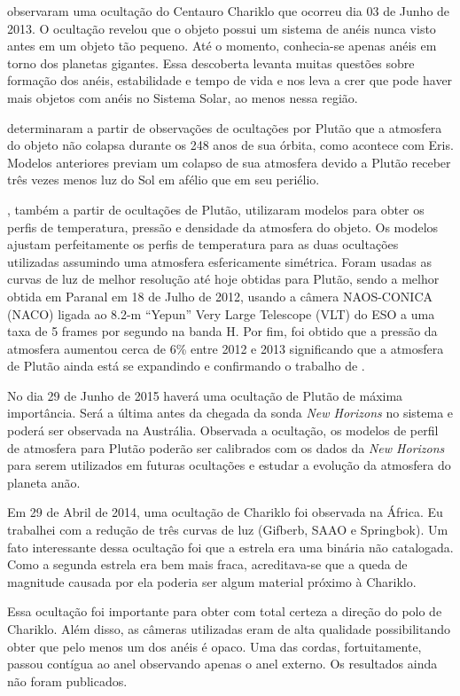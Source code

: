 \documentclass[12pt,a4paper]{monografia}
\begin{document}
\cite{BragaRibas2014} observaram uma ocultação do Centauro Chariklo que ocorreu dia 03 de Junho de 2013. O ocultação revelou que o objeto possui um sistema de anéis nunca visto antes em um objeto tão pequeno. Até o momento, conhecia-se apenas anéis em torno dos planetas gigantes. Essa descoberta levanta muitas questões sobre formação dos anéis, estabilidade e tempo de vida e nos leva a crer que pode haver mais objetos com anéis no Sistema Solar, ao menos nessa região.

\cite{Olkin2015} determinaram a partir de observações de ocultações por Plutão que a atmosfera do objeto não colapsa durante os 248 anos de sua órbita, como acontece com Eris. Modelos anteriores previam um colapso de sua atmosfera devido a Plutão receber três vezes menos luz do Sol em afélio que em seu periélio.

\cite{DiasOliveira2015}, também a partir de ocultações de Plutão, utilizaram modelos para obter os perfis de temperatura, pressão e densidade da atmosfera do objeto. Os modelos ajustam perfeitamente os perfis de temperatura para as duas ocultações utilizadas assumindo uma atmosfera esfericamente simétrica. Foram usadas as curvas de luz de melhor resolução até hoje obtidas para Plutão, sendo a melhor obtida em  Paranal em 18 de Julho de 2012, usando a câmera NAOS-CONICA (NACO) ligada ao 8.2-m “Yepun” Very Large Telescope (VLT) do ESO a uma taxa de 5 frames por segundo na banda H. Por fim, foi obtido que a pressão da atmosfera aumentou cerca de 6\% entre 2012 e 2013 significando que a atmosfera de Plutão ainda está se expandindo e confirmando o trabalho de \cite{Olkin2015}.

No dia 29 de Junho de 2015 haverá uma ocultação de Plutão de máxima importância. Será a última antes da chegada da sonda \textit{New Horizons} no sistema e poderá ser observada na Austrália. Observada a ocultação, os modelos de perfil de atmosfera para Plutão poderão ser calibrados com os dados da \textit{New Horizons} para serem utilizados em futuras ocultações e estudar a evolução da atmosfera do planeta anão.

Em 29 de Abril de 2014, uma ocultação de Chariklo foi observada na África. Eu trabalhei com a redução de três curvas de luz (Gifberb, SAAO e Springbok). Um fato interessante dessa ocultação foi que a estrela era uma binária não catalogada. Como a segunda estrela era bem mais fraca, acreditava-se que a queda de magnitude causada por ela poderia ser algum material próximo à Chariklo.

Essa ocultação foi importante para obter com total certeza a direção do polo de Chariklo. Além disso, as câmeras utilizadas eram de alta qualidade possibilitando obter que pelo menos um dos anéis é opaco. Uma das cordas, fortuitamente, passou contígua ao anel observando apenas o anel externo. Os resultados ainda não foram publicados.
\end{document}
